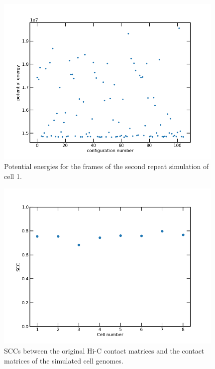 \documentclass[a4paper,11pt,oneside,final,english,toc=bib]{scrbook}
\newcommand{\figwidth}{11.0cm} %
\begin{document}
\begin{figure}[ht]
\centering
  \includegraphics[width=\figwidth]{potential_energy_cell1_2.png}
  \caption{Potential energies for the frames of the second repeat simulation of cell 1.}
  \label{fig:potential_energy_cell1_2}
\end{figure}

\begin{figure}[ht]
\centering
  \includegraphics[width=\figwidth]{hic_vs_sim_scc.png}
  \caption{SCCs between the original Hi-C contact matrices and the contact matrices of the simulated cell genomes.}
  \label{fig:hic_vs_sim_scc}
\end{figure}
\end{document}
